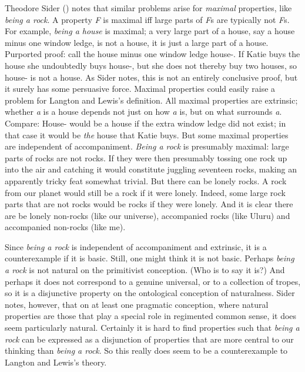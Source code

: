 \documentclass[
  11pt,
  letterpaper,
  DIV=11,
  numbers=noendperiod,
  twoside]{scrartcl}
\begin{document}
Theodore Sider () notes that similar
problems arise for \emph{maximal} properties, like \emph{being a rock}.
A property \emph{F} is maximal iff large parts of \emph{F}s are
typically not \emph{F}s. For example, \emph{being a house} is maximal; a
very large part of a house, say a house minus one window ledge, is not a
house, it is just a large part of a house. Purported proof: call the
house minus one window ledge house-. If Katie buys the house she
undoubtedly buys house-, but she does not thereby buy two houses, so
house- is not a house. As Sider notes, this is not an entirely
conclusive proof, but it surely has some persuasive force. Maximal
properties could easily raise a problem for Langton and Lewis's
definition. All maximal properties are extrinsic; whether \emph{a} is a
house depends not just on how \emph{a} is, but on what surrounds
\emph{a}. Compare: House- would be a house if the extra window ledge did
not exist; in that case it would be \emph{the} house that Katie buys.
But some maximal properties are independent of accompaniment.
\emph{Being a rock} is presumably maximal: large parts of rocks are not
rocks. If they were then presumably tossing one rock up into the air and
catching it would constitute juggling seventeen rocks, making an
apparently tricky feat somewhat trivial. But there can be lonely rocks.
A rock from our planet would still be a rock if it were lonely. Indeed,
some large rock parts that are not rocks would be rocks if they were
lonely. And it is clear there are be lonely non-rocks (like our
universe), accompanied rocks (like Uluru) and accompanied non-rocks
(like me).

Since \emph{being a rock} is independent of accompaniment and extrinsic,
it is a counterexample if it is basic. Still, one might think it is not
basic. Perhaps \emph{being a rock} is not natural on the primitivist
conception. (Who is to say it is?) And perhaps it does not correspond to
a genuine universal, or to a collection of tropes, so it is a
disjunctive property on the ontological conception of naturalness. Sider
notes, however, that on at least one pragmatic conception, where natural
properties are those that play a special role in regimented common
sense, it does seem particularly natural. Certainly it is hard to find
properties such that \emph{being a rock} can be expressed as a
disjunction of properties that are more central to our thinking than
\emph{being a rock}. So this really does seem to be a counterexample to
Langton and Lewis's theory.
\end{document}
